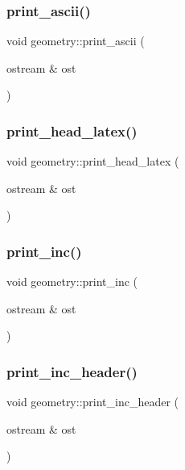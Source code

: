 \subsubsection{\texorpdfstring{print\+\_\+ascii()}{print\_ascii()}}
{\footnotesize\ttfamily void geometry\+::print\+\_\+ascii (\begin{DoxyParamCaption}\item[{ostream \&}]{ost }\end{DoxyParamCaption})}

\mbox{\label{classgeometry_a1a65ce3ff3b89b6bb663aa9a559ada2a}} 
\subsubsection{\texorpdfstring{print\+\_\+head\+\_\+latex()}{print\_head\_latex()}}
{\footnotesize\ttfamily void geometry\+::print\+\_\+head\+\_\+latex (\begin{DoxyParamCaption}\item[{ostream \&}]{ost }\end{DoxyParamCaption})}

\mbox{\label{classgeometry_a8b902a6f06a92a18b345e4de42e6508d}} 
\subsubsection{\texorpdfstring{print\+\_\+inc()}{print\_inc()}}
{\footnotesize\ttfamily void geometry\+::print\+\_\+inc (\begin{DoxyParamCaption}\item[{ostream \&}]{ost }\end{DoxyParamCaption})}

\mbox{\label{classgeometry_ab78810f270f25de6b65169d5c62d7806}} 
\subsubsection{\texorpdfstring{print\+\_\+inc\+\_\+header()}{print\_inc\_header()}}
{\footnotesize\ttfamily void geometry\+::print\+\_\+inc\+\_\+header (\begin{DoxyParamCaption}\item[{ostream \&}]{ost }\end{DoxyParamCaption})}


